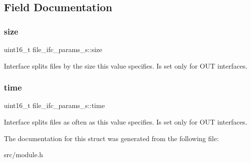 \subsection{Field Documentation}
\mbox{\label{structfile__ifc__params__s_a0d45dede0d17ebd5fae989c321408760}} 
\subsubsection{\texorpdfstring{size}{size}}
{\footnotesize\ttfamily uint16\+\_\+t file\+\_\+ifc\+\_\+params\+\_\+s\+::size}

Interface splits files by the size this value specifies. Is set only for O\+UT interfaces. \mbox{\label{structfile__ifc__params__s_af44673d76ef750daaa14d0b341105ff6}} 
\subsubsection{\texorpdfstring{time}{time}}
{\footnotesize\ttfamily uint16\+\_\+t file\+\_\+ifc\+\_\+params\+\_\+s\+::time}

Interface splits files as often as this value specifies. Is set only for O\+UT interfaces. 

The documentation for this struct was generated from the following file\+:\begin{DoxyCompactItemize}
\item 
src/module.\+h\end{DoxyCompactItemize}
